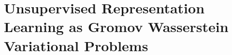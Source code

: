 \chapter{Unsupervised Representation Learning as Gromov Wasserstein Variational Problems}\label{chapter:DistR}

\minitoc









